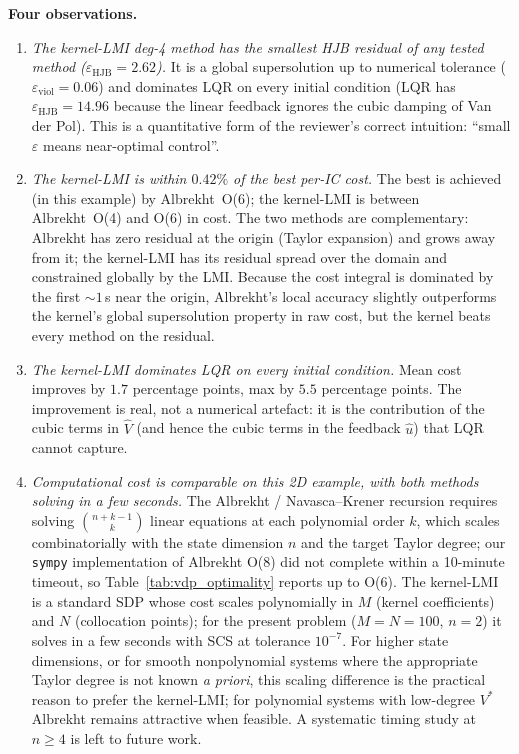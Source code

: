 \documentclass[11pt]{article}
\begin{document}
\textbf{Four observations.}

\begin{enumerate}
\item \emph{The kernel-LMI deg-4 method has the smallest HJB residual of any tested method ($\varepsilon_{\mathrm{HJB}} = 2.62$).} It is a global supersolution up to numerical tolerance ($\varepsilon_{\mathrm{viol}} = 0.06$) and dominates LQR on every initial condition (LQR has $\varepsilon_{\mathrm{HJB}} = 14.96$ because the linear feedback ignores the cubic damping of Van der Pol). This is a quantitative form of the reviewer's correct intuition: ``small $\varepsilon$ means near-optimal control''.
\item \emph{The kernel-LMI is within $0.42\%$ of the best per-IC cost.} The best is achieved (in this example) by Albrekht~O(6); the kernel-LMI is between Albrekht~O(4) and O(6) in cost. The two methods are complementary: Albrekht has zero residual at the origin (Taylor expansion) and grows away from it; the kernel-LMI has its residual spread over the domain and constrained globally by the LMI. Because the cost integral is dominated by the first $\sim 1$\,s near the origin, Albrekht's local accuracy slightly outperforms the kernel's global supersolution property in raw cost, but the kernel beats every method on the residual.
\item \emph{The kernel-LMI dominates LQR on every initial condition.} Mean cost improves by $1.7$ percentage points, max by $5.5$ percentage points. The improvement is real, not a numerical artefact: it is the contribution of the cubic terms in $\hat V$ (and hence the cubic terms in the feedback $\hat u$) that LQR cannot capture.
\item \emph{Computational cost is comparable on this 2D example, with both methods solving in a few seconds.} The Albrekht / Navasca--Krener recursion requires solving $\binom{n+k-1}{k}$ linear equations at each polynomial order $k$, which scales combinatorially with the state dimension $n$ and the target Taylor degree; our \texttt{sympy} implementation of Albrekht O(8) did not complete within a 10-minute timeout, so Table~\ref{tab:vdp_optimality} reports up to O(6). The kernel-LMI is a standard SDP whose cost scales polynomially in $M$ (kernel coefficients) and $N$ (collocation points); for the present problem ($M = N = 100$, $n = 2$) it solves in a few seconds with SCS at tolerance $10^{-7}$. For higher state dimensions, or for smooth nonpolynomial systems where the appropriate Taylor degree is not known \textit{a priori}, this scaling difference is the practical reason to prefer the kernel-LMI; for polynomial systems with low-degree $V^*$ Albrekht remains attractive when feasible. A systematic timing study at $n \geq 4$ is left to future work.
\end{enumerate}
\end{document}
